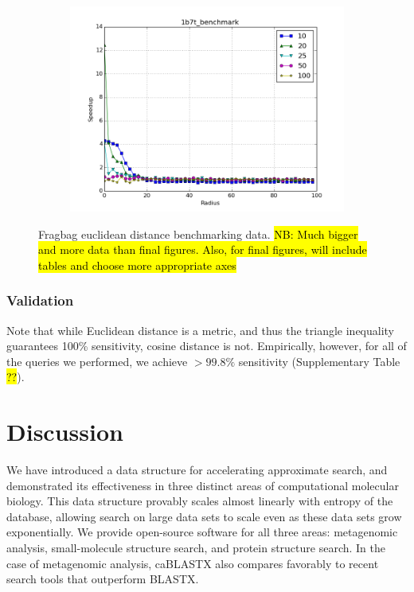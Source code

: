 \documentclass[review,preprint,12pt]{elsarticle}
\theoremstyle{definition}
\theoremstyle{remark}
\numberwithin{equation}{section}
\begin{document}
\begin{figure}[tbp]
\begin{subfigure}[b]{0.49\textwidth}
        \includegraphics[width=1\textwidth]{assets/1b7t_benchmark_euclid}
        \caption{}
    \end{subfigure}
    \caption{Fragbag euclidean distance benchmarking data. \hl{NB: Much bigger and more data than final figures. Also, for final figures, will include tables and choose more appropriate axes}}
    \label{fig:fragbag_euclid}
\end{figure}


\subsubsection{Validation}
Note that while Euclidean distance is a metric, and thus the triangle inequality guarantees 100\% sensitivity, cosine distance is not.
Empirically, however, for all of the queries we performed, we achieve $> 99.8\%$ sensitivity (Supplementary Table \hl{??}).

\section{Discussion}

We have introduced a data structure for accelerating approximate search, and
demonstrated its effectiveness in three distinct areas of computational
molecular biology.
This data structure provably scales almost linearly with entropy of the 
database, allowing search on large data sets to scale even as these data sets
grow exponentially.
We provide open-source software for all three areas: metagenomic analysis,
small-molecule structure search, and protein structure search.
In the case of metagenomic analysis, caBLASTX also compares favorably to recent 
search tools that outperform BLASTX.
\end{document}
